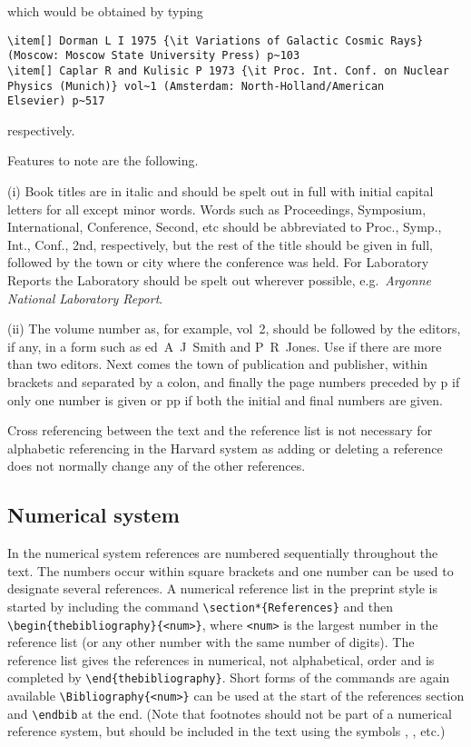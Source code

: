\noindent which would be obtained by typing
\begin{verbatim}
\item[] Dorman L I 1975 {\it Variations of Galactic Cosmic Rays}
(Moscow: Moscow State University Press) p~103
\item[] Caplar R and Kulisic P 1973 {\it Proc. Int. Conf. on Nuclear
Physics (Munich)} vol~1 (Amsterdam: North-Holland/American
Elsevier) p~517
\end{verbatim}
\noindent respectively.


Features to note are the following.

(i) Book titles are in italic and should be spelt out in full with
initial capital letters for all except minor words. Words such as
Proceedings, Symposium, International, Conference, Second, etc should
be abbreviated to Proc., Symp., Int., Conf., 2nd,
respectively, but the rest of the title should be given in full,
followed by the town or city where the conference was held. For
Laboratory Reports the Laboratory should be spelt out wherever
possible, e.g.\ {\it Argonne National Laboratory Report}.

(ii) The volume number as, for example, vol~2, should be followed by
the editors, if any, in a form such as ed~A~J~Smith and P~R~Jones. Use
\etal if there are more than two editors. Next comes the town of
publication and publisher, within brackets and separated by a colon,
and finally the page numbers preceded by p if only one number is given
or pp if both the initial and final numbers are given.

Cross referencing between the text and the
reference list is not necessary for alphabetic referencing
in the Harvard system as adding or deleting a reference
does not normally change any of the other references.

\subsection{Numerical system}
In the numerical system references are numbered sequentially
throughout the text. The numbers occur within square brackets and one
number can be used to designate several references. A numerical
reference list in the preprint style is started by including the
command \verb"\section*{References}" and then
\verb"\begin{thebibliography}{<num>}", where \verb"<num>" is the largest
number in the reference list (or any other number with the same number
of digits).  The
reference list gives the references in
numerical, not alphabetical, order and is completed by
\verb"\end{thebibliography}". Short forms of the commands are again
available \verb"\Bibliography{<num>}" can be used at the start of the
references section and \verb"\endbib" at the end.
(Note that footnotes should not be
part of a numerical reference system, but should be included in the
text using the symbols \dag, \ddag, etc.)

